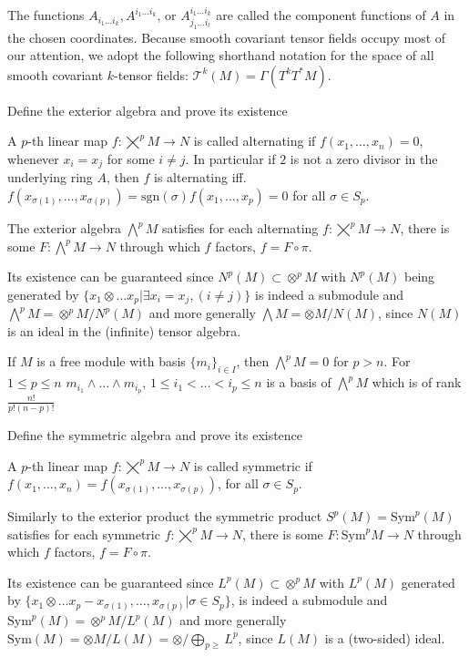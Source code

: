 The functions \(A_{i_{1}...i_{k}}, A^{i_{1}...i_{k}}\), or \(A_{j_{1}...i_{l}}^{i_{1}...i_{k}}\) 
are called the component functions of \(A\) in the chosen coordinates. 
Because smooth covariant tensor fields occupy most of our attention, 
we adopt the following shorthand notation for the space of all smooth covariant \(k\)-tensor fields:
\(\mathcal{T}^{k}(M)=\Gamma(T^{k}T^{*}M).\)

Define the exterior algebra and prove its existence

A \(p\)-th linear map \(f : \bigtimes^{p} M \to N\) is called alternating if \(f(x_1, \dots, x_n) = 0\), whenever \(x_i = x_j\) for some \(i \neq j\).
In particular if \(2\) is not a zero divisor in the underlying ring \(A\), then \(f\) is alternating iff. 
\(f(x_{\sigma(1)}, \dots, x_{\sigma(p)}) = \text{sgn}(\sigma)f(x_1, \dots, x_p) = 0\) for all \(\sigma \in S_p\).

The exterior algebra \(\bigwedge^{p} M\) satisfies for each alternating \(f : \bigtimes^{p} M \to N\), there is some \(F : \bigwedge^{p} M \to N\)
through which \(f\) factors, \(f = F \circ \pi\).

Its existence can be guaranteed since \(N^p(M) \subset \otimes^{p} M\) with \(N^p(M)\) being generated by \(\{ x_1 \otimes \dots x_p | \exists x_i = x_j, (i \neq j) \}\) 
is indeed a submodule and \(\bigwedge^{p} M = \otimes^{p} M / N^p(M)\) and more generally \(\bigwedge M = \otimes M / N(M)\), since \(N(M)\) is an ideal
in the (infinite) tensor algebra.

If \(M\) is a free module with basis \(\{m_i\}_{i \in I}\), then \(\bigwedge^{p} M = 0\) for \(p > n\). For \(1 \leq p \leq n\) 
\(m_{i_1} \wedge \dots \wedge m_{i_p}\), \(1 \leq i_1 < \dots < i_p \leq n\) is a basis of \(\bigwedge^{p} M\) which is of rank \(\frac{n!}{p!(n - p)!}\)

Define the symmetric algebra and prove its existence

A \(p\)-th linear map \(f : \bigtimes^{p} M \to N\) is called symmetric if \(f(x_1, \dots, x_n) = f(x_{\sigma(1)}, \dots, x_{\sigma(p)})\), for all \(\sigma \in S_p\).

Similarly to the exterior product the symmetric product \(S^p(M) = \text{Sym}^{p}(M)\) 
satisfies for each symmetric \(f : \bigtimes^{p} M \to N\), there is some \(F : \text{Sym}^{p} M \to N\)
through which \(f\) factors, \(f = F \circ \pi\).

Its existence can be guaranteed since \(L^p(M) \subset \otimes^{p} M\) with \(L^p(M)\) generated by \(\{ x_1 \otimes \dots x_p - x_{\sigma(1)}, \dots, x_{\sigma(p)} | \sigma \in S_p \}\), 
is indeed a submodule and \(\text{Sym}^{p}(M) = \otimes^{p} M / L^p(M)\) and more generally \(\text{Sym}(M) = \otimes M / L(M) = \otimes / \bigoplus_{p \geq} L^{p} \), since \(L(M)\) is a (two-sided) ideal.

